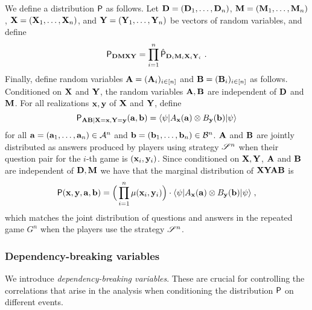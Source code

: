 We define a distribution $\P$ as follows. Let $\bD = (\bD_1,\ldots,\bD_n)$, $\bM = (\bM_1,\ldots,\bM_n)$, $\bX = (\bX_1,\ldots,\bX_n)$, and $\bY = (\bY_1,\ldots,\bY_n)$ be vectors of random variables, and define
\[
	\P_{\bD \bM \bX \bY} = \prod_{i=1}^n \hat{\P}_{\bD_i \bM_i \bX_i \bY_i}~.
\]
Finally, define random variables $\bA = (\bA_i)_{i \in [n]}$ and $\bB = (\bB_i)_{i \in [n]}$ as follows. Conditioned on $\bX$ and $\bY$, the random variables $\bA,\bB$ are independent of $\bD$ and $\bM$. For all realizations $\bx, \by$ of $\bX$ and $\bY$, define
\[
	\P_{\bA \bB | \bX = \bx, \bY = \by}(\ba,\bb) = \bra{\psi} A_\bx(\ba) \otimes B_\by(\bb) \ket{\psi}
\]
for all $\ba = (\ba_1,\ldots,\ba_n) \in \A^n$ and $\bb = (\bb_1,\ldots,\bb_n) \in \B^n$. $\bA$ and $\bB$ are jointly distributed as answers produced by players using strategy $\strategy^n$ when their question pair for the $i$-th game is $(\bx_i,\by_i)$. 
Since conditioned on $\bX, \bY$, $\bA$ and $\bB$ are independent of $\bD,\bM$ we have that the marginal distribution of $\bX \bY \bA \bB$ is
	\[
		\P(\bx,\by,\ba,\bb) = \Big ( \prod_{i=1}^n \mu(\bx_i,\by_i) \Big) \cdot \bra{\psi} A_\bx(\ba) \otimes B_\by(\bb) \ket{\psi}\;,
	\]
	which matches the joint distribution of questions and answers in the repeated game $G^n$ when the players use the strategy $\strategy^n$.

%
%
%	


\subsubsection{Dependency-breaking variables} 
\label{sec:dep-var}

 
We introduce \emph{dependency-breaking variables}. These are crucial for controlling the correlations that arise in the analysis when conditioning the  distribution $\P$ on different events. 

